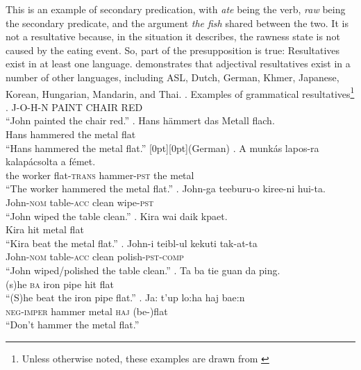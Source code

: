 \documentclass[MilwayThesis]{subfiles}
\begin{document}
This is an example of secondary predication, with \textit{ate} being the verb, \textit{raw} being the secondary predicate, and the argument \textit{the fish} shared between the two.
It is not a resultative because, in the situation it describes, the rawness state is not caused by the eating event.
So, part of the presupposition is true: Resultatives exist in at least one language.
\textcite{snyder1995language,snyder2001nature} demonstrates that adjectival resultatives exist in a number of other languages, including ASL, Dutch, German, Khmer, Japanese, Korean, Hungarian, Mandarin, and Thai.
\ex. Examples of grammatical resultatives\footnote{Unless otherwise noted, these examples are drawn from \textcite{snyder2001nature}}\\
\a. J-O-H-N PAINT CHAIR RED\hfill\parencite[ASL,][]{kentner2018wh}\\
``John painted the chair red.''
\bg. Hans h\"ammert das Metall flach.\\
Hans hammered the metal flat\\
``Hans hammered the metal flat.'' \hfill \raisebox{1.4\baselineskip}[0pt][0pt]{(German)}
\bg. A munk\'as lapos-ra kalap\'acsolta a f\'emet.\\
the worker flat-\textsc{trans} hammer-\textsc{pst} the metal\\
``The worker hammered the metal flat.'' 
\bg. John-ga teeburu-o kiree-ni hui-ta.\\
John-\textsc{nom} table-\textsc{acc} clean wipe-\textsc{pst}\\
``John wiped the table clean.''
\bg. Kira wai daik kpaet.\\
Kira hit metal flat\\
``Kira beat the metal flat.''
\bg. John-i teibl-ul kekuti tak-at-ta\\
John-\textsc{nom} table-\textsc{acc} clean polish-\textsc{pst}-\textsc{comp}\\
``John wiped/polished the table clean.''
\bg. Ta ba tie guan da ping.\\
(s)he \textsc{ba} iron pipe hit flat\\
``(S)he beat the iron pipe flat.''
\bg. Ja: t'up lo:ha\textglotstop{} haj bae:n\\
\textsc{neg-imper} hammer metal \textsc{haj} (be-)flat\\
``Don't hammer the metal flat.''
\end{document}
